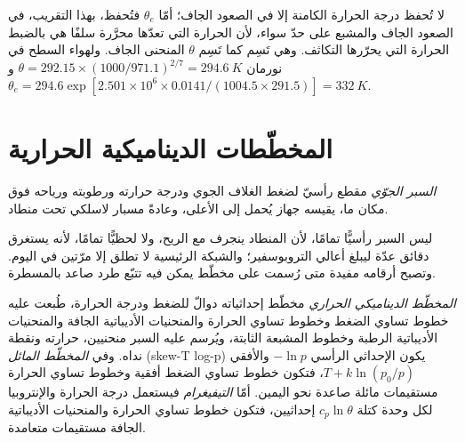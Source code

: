لا تُحفظ درجة الحرارة الكامنة إلا في الصعود الجاف؛ أمّا $\theta_e$ فتُحفظ، بهذا
التقريب، في الصعود الجاف والمشبع على حدّ سواء، لأن الحرارة التي تعدّها محرَّرة سلفًا
هي بالضبط الحرارة التي يحرّرها التكاثف. وهي تَسِم  كما تَسِم $\theta$ المنحنى الجاف.
ولهواء السطح في نورمان $\theta = 292.15 \times (1000/971.1)^{2/7} = \qty{294.6}{K}$
و$\theta_e = 294.6 \exp[2.501 \times 10^6 \times 0.0141/(1004.5 \times 291.5)] = \qty{332}{K}$.

\section{المخطّطات الديناميكية الحرارية}\label{sec:b2:atmospheric-thermodynamics:diagrams}

\begin{definition}\label{def:b2:atmospheric-thermodynamics:sounding}
\emph{السبر الجوّي} مقطع رأسيّ لضغط
الغلاف الجوي ودرجة حرارته ورطوبته ورياحه فوق مكان ما، يقيسه
جهاز يُحمل إلى الأعلى، وعادةً مسبار لاسلكي تحت منطاد.
\end{definition}

ليس السبر رأسيًّا تمامًا، لأن المنطاد ينجرف مع الريح، ولا
لحظيًّا تمامًا، لأنه يستغرق دقائق عدّة ليبلغ أعالي التروبوسفير؛ والشبكة
الرئيسية لا تطلق إلا مرّتين في اليوم. وتصبح أرقامه مفيدة متى رُسمت على مخطّط
يمكن فيه تتبّع طرد صاعد بالمسطرة.

\begin{definition}\label{def:b2:atmospheric-thermodynamics:diagram}
\emph{المخطّط الديناميكي الحراري} مخطّط إحداثياته
دوالّ للضغط ودرجة الحرارة، طُبعت عليه خطوط تساوي الضغط وخطوط تساوي الحرارة والمنحنيات الأديباتية الجافة والمنحنيات الأديباتية
الرطبة وخطوط  المشبعة الثابتة، ويُرسم عليه السبر
منحنيين، حرارته ونقطة نداه. وفي \emph{المخطّط
المائل} (skew-T log-p) يكون الإحداثي الرأسي $-\ln p$ والأفقي
$T + k\ln(p_0/p)$، فتكون خطوط تساوي الضغط أفقية وخطوط تساوي الحرارة مستقيمات مائلة صاعدة نحو
اليمين. أمّا \emph{التيفيغرام} فيستعمل درجة الحرارة والإنتروبيا لكل وحدة
كتلة $c_p\ln\theta$ إحداثيين، فتكون خطوط تساوي الحرارة والمنحنيات الأديباتية الجافة مستقيمات
متعامدة.
\end{definition}

